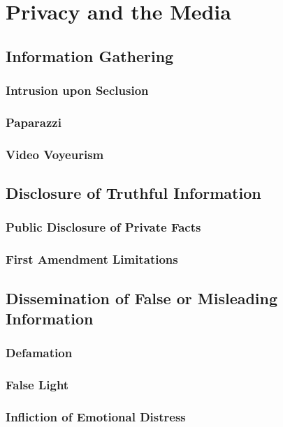 \section{Privacy and the Media}

\subsection{Information Gathering}

\subsubsection{Intrusion upon Seclusion}


\subsubsection{Paparazzi}


\subsubsection{Video Voyeurism}


\subsection{Disclosure of Truthful Information}

\subsubsection{Public Disclosure of Private Facts}


\subsubsection{First Amendment Limitations}


\subsection{Dissemination of False or Misleading Information}

\subsubsection{Defamation}


\subsubsection{False Light}


\subsubsection{Infliction of Emotional Distress}

